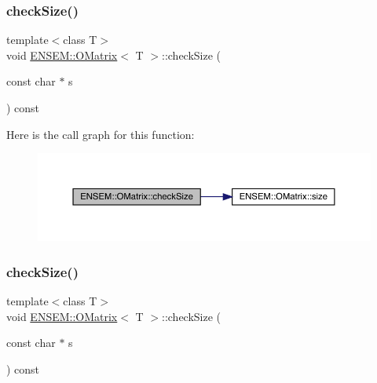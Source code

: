 \subsubsection{\texorpdfstring{checkSize()}{checkSize()}\hspace{0.1cm}{\footnotesize\ttfamily [1/6]}}
{\footnotesize\ttfamily template$<$class T$>$ \\
void \mbox{\hyperlink{classENSEM_1_1OMatrix}{E\+N\+S\+E\+M\+::\+O\+Matrix}}$<$ T $>$\+::check\+Size (\begin{DoxyParamCaption}\item[{const char $\ast$}]{s }\end{DoxyParamCaption}) const\hspace{0.3cm}{\ttfamily [inline]}}

Here is the call graph for this function\+:
\nopagebreak
\begin{figure}[H]
\begin{center}
\leavevmode
\includegraphics[width=350pt]{dd/d80/classENSEM_1_1OMatrix_abec80929ab7e8e2a23822fbbc841bd87_cgraph}
\end{center}
\end{figure}
\mbox{\label{classENSEM_1_1OMatrix_abec80929ab7e8e2a23822fbbc841bd87}} 
\subsubsection{\texorpdfstring{checkSize()}{checkSize()}\hspace{0.1cm}{\footnotesize\ttfamily [2/6]}}
{\footnotesize\ttfamily template$<$class T$>$ \\
void \mbox{\hyperlink{classENSEM_1_1OMatrix}{E\+N\+S\+E\+M\+::\+O\+Matrix}}$<$ T $>$\+::check\+Size (\begin{DoxyParamCaption}\item[{const char $\ast$}]{s }\end{DoxyParamCaption}) const\hspace{0.3cm}{\ttfamily [inline]}}

